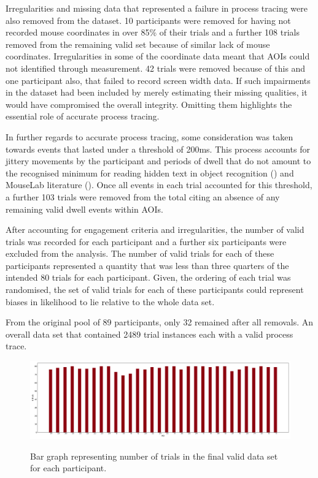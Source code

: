\documentclass[man, floatsintext]{apa7}
\begin{document}
Irregularities and missing data that represented a failure in process tracing were also removed from the dataset. 10 participants were removed for having not recorded mouse coordinates in over 85\% of their trials and a further 108 trials removed from the remaining valid set because of similar lack of mouse coordinates. Irregularities in some of the coordinate data meant that AOIs could not identified through measurement. 42 trials were removed because of this and one participant also, that failed to record screen width data. If such impairments in the dataset had been included by merely estimating their missing qualities, it would have compromised the overall integrity. Omitting them highlights the essential role of accurate process tracing.

In further regards to accurate process tracing, some consideration was taken towards events that lasted under a threshold of 200ms. This process accounts for jittery movements by the participant and periods of dwell that do not amount to the recognised minimum for reading hidden text in object recognition (\cite{dicarloHowDoesBrain2012}) and MouseLab literature (\cite{willemsenVisitingDecisionFactory2011}). Once all events in each trial accounted for this threshold, a further 103 trials were removed from the total citing an absence of any remaining valid dwell events within AOIs. 

After accounting for engagement criteria and irregularities, the number of valid trials was recorded for each participant and a further six participants were excluded from the analysis. The number of valid trials for each of these participants represented a quantity that was less than three quarters of the intended 80 trials for each participant. Given, the ordering of each trial was randomised, the set of valid trials for each of these participants could represent biases in likelihood to lie relative to the whole data set.

From the original pool of 89 participants, only 32 remained after all removals. An overall data set that contained 2489 trial instances each with a valid process trace.

\begin{figure}[H]
	\includegraphics[width=\linewidth]{../plots/RESPONSE/NTrialsByPID.png}
	\label{fig:NTrialsByPID}
	\caption{Bar graph representing number of trials in the final valid data set for each participant.}
\end{figure}
\end{document}
